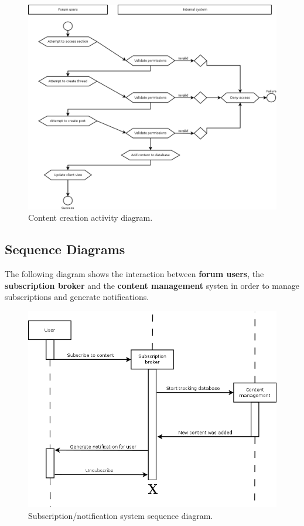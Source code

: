 \documentclass[12pt]{report}
\renewcommand\emph{\textbf}
\begin{document}
                    \begin{figure}[!htb]
                    \caption{Content creation activity diagram.}
                    \centering
                    \includegraphics[width=1\textwidth]{uc/a2}
                    \end{figure}

                    \newpage

                \subsection{Sequence Diagrams}
                    
                    The following diagram shows the interaction between \emph{forum users}, the \emph{subscription broker} and the \emph{content management} systen in order to manage subscriptions and generate notifications.

                    \begin{figure}[!htb]
                    \caption{Subscription/notification system sequence diagram.}
                    \centering
                    \includegraphics[width=1\textwidth]{uc/s1}
                    \end{figure}
\end{document}
